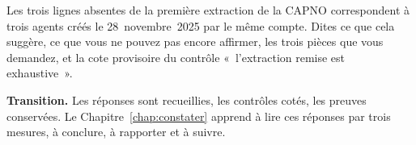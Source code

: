 \begin{boxexo}[title={\ding{45}\quad Exercice~7.4. Trois lignes \niveauexpert}]
Les trois lignes absentes de la première extraction de la CAPNO
correspondent à trois agents créés le 28~novembre~2025 par le même compte.
Dites ce que cela suggère, ce que vous ne pouvez pas encore affirmer, les
trois pièces que vous demandez, et la cote provisoire du contrôle
«~l'extraction remise est exhaustive~».
\end{boxexo}

\begin{boxinfo}
\textbf{Transition.} Les réponses sont recueillies, les contrôles cotés,
les preuves conservées. Le Chapitre~\ref{chap:constater} apprend à lire
ces réponses par trois mesures, à conclure, à rapporter et à suivre.
\end{boxinfo}
